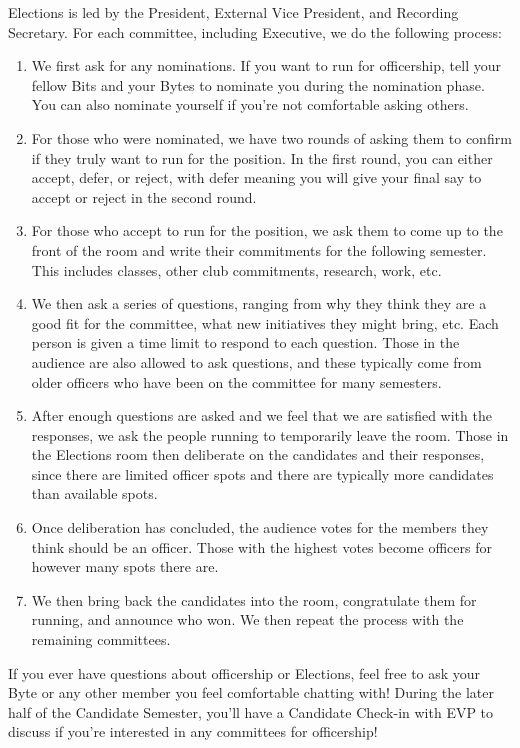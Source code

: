\documentclass[11pt, article, oneside]{memoir}
\begin{document}
        Elections is led by the President, External Vice President, and Recording Secretary. For each committee, including Executive, we do the following process:
        \begin{enumerate}
            \item We first ask for any nominations. If you want to run for officership, tell your fellow Bits and your Bytes to nominate you during the nomination phase. You can also nominate yourself if you're not comfortable asking others.
            \item For those who were nominated, we have two rounds of asking them to confirm if they truly want to run for the position. In the first round, you can either accept, defer, or reject, with defer meaning you will give your final say to accept or reject in the second round.
            \item For those who accept to run for the position, we ask them to come up to the front of the room and write their commitments for the following semester. This includes classes, other club commitments, research, work, etc. 
            \item We then ask a series of questions, ranging from why they think they are a good fit for the committee, what new initiatives they might bring, etc. Each person is given a time limit to respond to each question. Those in the audience are also allowed to ask questions, and these typically come from older officers who have been on the committee for many semesters.
            \item After enough questions are asked and we feel that we are satisfied with the responses, we ask the people running to temporarily leave the room. Those in the Elections room then deliberate on the candidates and their responses, since there are limited officer spots and there are typically more candidates than available spots.
            \item Once deliberation has concluded, the audience votes for the members they think should be an officer. Those with the highest votes become officers for however many spots there are.
            \item We then bring back the candidates into the room, congratulate them for running, and announce who won. We then repeat the process with the remaining committees.
        \end{enumerate}

        If you ever have questions about officership or Elections, feel free to ask your Byte or any other member you feel comfortable chatting with! During the later half of the Candidate Semester, you'll have a Candidate Check-in with EVP to discuss if you're interested in any committees for officership!
\end{document}
